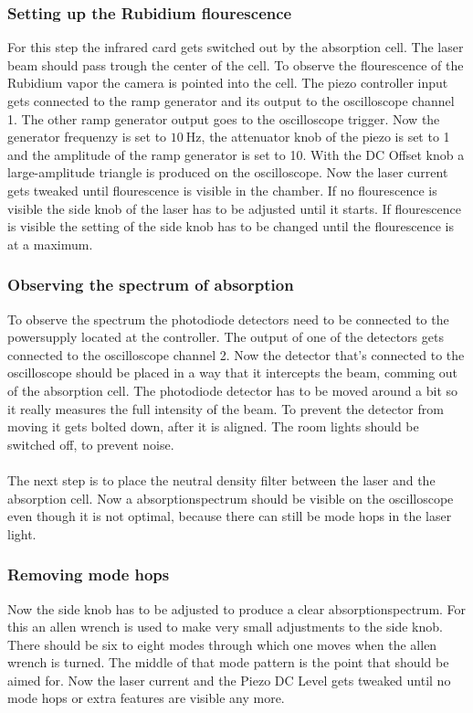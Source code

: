 \subsubsection{Setting up the Rubidium flourescence}
\label{sec:flourescence}
For this step the infrared card gets switched out by the absorption cell.
The laser beam should pass trough the center of the cell.
To observe the flourescence of the Rubidium vapor the camera is pointed into the cell.
The piezo controller input gets connected to the ramp generator and its output to the oscilloscope channel 1.
The other ramp generator output goes to the oscilloscope trigger.
Now the generator frequenzy is set to $\SI{10}{\Hz}$, the attenuator knob of the piezo is set to 1 and the amplitude of the ramp generator is set to 10.
With the DC Offset knob a large-amplitude triangle is produced on the oscilloscope.
Now the laser current gets tweaked until flourescence is visible in the chamber.
If no flourescence is visible the side knob of the laser has to be adjusted until it starts.
If flourescence is visible the setting of the side knob has to be changed until the flourescence is at a maximum.

\subsubsection{Observing the spectrum of absorption}
To observe the spectrum the photodiode detectors need to be connected to the powersupply located at the controller.
The output of one of the detectors gets connected to the oscilloscope channel 2.
Now the detector that's connected to the oscilloscope should be placed in a way that it intercepts the beam, comming out of the absorption cell.
The photodiode detector has to be moved around a bit so it really measures the full intensity of the beam.
To prevent the detector from moving it gets bolted down, after it is aligned.
The room lights should be switched off, to prevent noise.
\\\\
The next step is to place the neutral density filter between the laser and the absorption cell.
Now a absorptionspectrum should be visible on the oscilloscope even though it is not optimal, because there can still be mode hops in the laser light.

\subsubsection{Removing mode hops}
Now the side knob has to be adjusted to produce a clear absorptionspectrum.
For this an allen wrench is used to make very small adjustments to the side knob.
There should be six to eight modes through which one moves when the allen wrench is turned.
The middle of that mode pattern is the point that should be aimed for.
Now the laser current and the Piezo DC Level gets tweaked until no mode hops or extra features are visible any more.

